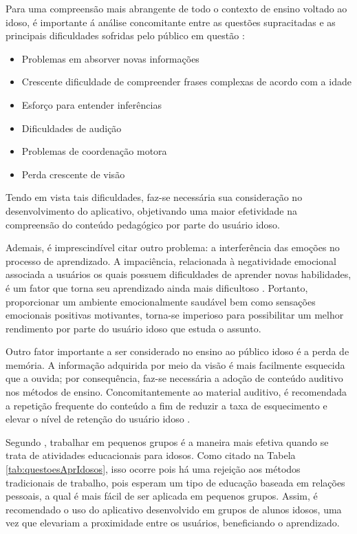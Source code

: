 Para uma compreensão mais abrangente de todo o contexto de ensino voltado ao idoso, é importante á análise concomitante entre as questões supracitadas e as principais dificuldades sofridas pelo público em questão \citep{euromed}:

\begin{itemize}
    \item Problemas em absorver novas informações
    \item Crescente dificuldade de compreender frases complexas de acordo com a idade
    \item Esforço para entender inferências
    \item Dificuldades de audição
    \item Problemas de coordenação motora
    \item Perda crescente de visão
\end{itemize}

Tendo em vista tais dificuldades, faz-se necessária sua consideração no desenvolvimento do aplicativo, objetivando uma maior efetividade na compreensão do conteúdo pedagógico por parte do usuário idoso.

Ademais, é imprescindível citar outro problema: a interferência das emoções no processo de aprendizado. A impaciência, relacionada à negatividade emocional associada a usuários os quais possuem dificuldades de aprender novas habilidades, é um fator que torna seu aprendizado ainda mais dificultoso \citep{Edukacja}. Portanto, proporcionar um ambiente emocionalmente saudável bem como sensações emocionais positivas motivantes, torna-se imperioso para possibilitar um melhor rendimento por parte do usuário idoso que estuda o assunto.

Outro fator importante a ser considerado no ensino ao público idoso é a perda de memória. A informação adquirida por meio da visão é mais facilmente esquecida que a ouvida; por consequência,  faz-se necessária a adoção de conteúdo auditivo nos métodos de ensino. Concomitantemente ao material auditivo, é recomendada a repetição frequente do conteúdo a fim de reduzir a taxa de esquecimento e elevar o nível de retenção do usuário idoso \citep{euromed}.

Segundo \cite{Edukacja}, trabalhar em pequenos grupos é a maneira mais efetiva quando se trata de atividades educacionais para idosos. Como citado na Tabela \ref{tab:questoesAprIdosos}, isso ocorre pois há uma rejeição aos métodos tradicionais de trabalho, pois esperam um tipo de educação baseada em relações pessoais, a qual é mais fácil de ser aplicada em pequenos grupos. Assim, é recomendado o uso do aplicativo desenvolvido em grupos de alunos idosos, uma vez que elevariam a proximidade entre os usuários, beneficiando o aprendizado.

